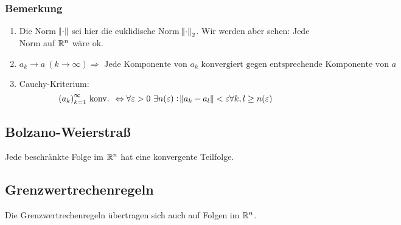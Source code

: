 \subsubsection{Bemerkung}
\begin{enumerate}[label= (\alph*)]
    \item Die Norm $\norm{\cdot}$ sei hier die euklidische Norm $\norm{\cdot}_2$. Wir
        werden aber sehen: Jede Norm auf $\mathbb{R}^n$ wäre ok.
    \item
        \begin{equation*}
            a_k \rightarrow a\ (k \rightarrow \infty) \Rightarrow
            \text{ Jede Komponente von }a_k\text{ konvergiert gegen entsprechende
            Komponente von }a
        \end{equation*}
    \item Cauchy-Kriterium:
        \begin{equation*}
            {(a_k)}_{k=1}^\infty \text{ konv. } \Leftrightarrow \forall \varepsilon > 0\ \exists
            n(\varepsilon): \norm{a_k - a_l} < \varepsilon
            \forall k,l \geq n(\varepsilon)
        \end{equation*}
\end{enumerate}

\subsection{Bolzano-Weierstraß}
Jede beschränkte Folge im $\mathbb{R}^n$ hat eine konvergente Teilfolge.

\subsection{Grenzwertrechenregeln}
Die Grenzwertrechenregeln übertragen sich auch auf Folgen im $\mathbb{R}^n$.

